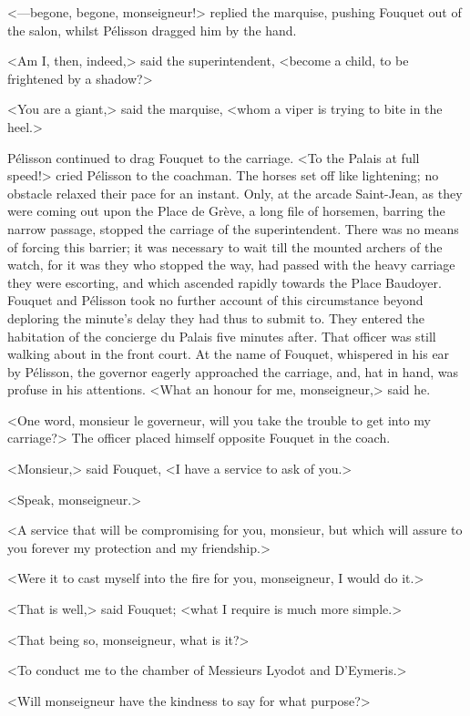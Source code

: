 <—begone, begone, monseigneur!> replied the marquise, pushing Fouquet out of the salon, whilst Pélisson dragged him by the hand.

<Am I, then, indeed,> said the superintendent, <become a child, to be frightened by a shadow?>

<You are a giant,> said the marquise, <whom a viper is trying to bite in the heel.>

Pélisson continued to drag Fouquet to the carriage. <To the Palais at full speed!> cried Pélisson to the coachman. The horses set off like lightening; no obstacle relaxed their pace for an instant. Only, at the arcade Saint-Jean, as they were coming out upon the Place de Grève, a long file of horsemen, barring the narrow passage, stopped the carriage of the superintendent. There was no means of forcing this barrier; it was necessary to wait till the mounted archers of the watch, for it was they who stopped the way, had passed with the heavy carriage they were escorting, and which ascended rapidly towards the Place Baudoyer. Fouquet and Pélisson took no further account of this circumstance beyond deploring the minute's delay they had thus to submit to. They entered the habitation of the concierge du Palais five minutes after. That officer was still walking about in the front court. At the name of Fouquet, whispered in his ear by Pélisson, the governor eagerly approached the carriage, and, hat in hand, was profuse in his attentions. <What an honour for me, monseigneur,> said he.

<One word, monsieur le governeur, will you take the trouble to get into my carriage?> The officer placed himself opposite Fouquet in the coach.

<Monsieur,> said Fouquet, <I have a service to ask of you.>

<Speak, monseigneur.>

<A service that will be compromising for you, monsieur, but which will assure to you forever my protection and my friendship.>

<Were it to cast myself into the fire for you, monseigneur, I would do it.>

<That is well,> said Fouquet; <what I require is much more simple.>

<That being so, monseigneur, what is it?>

<To conduct me to the chamber of Messieurs Lyodot and D'Eymeris.>

<Will monseigneur have the kindness to say for what purpose?>

